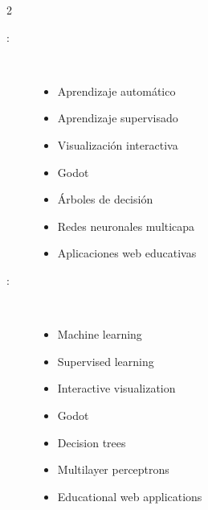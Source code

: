 \begin{multicols}{2}
\begin{description}
\item [\palabraschaveprincipal:] \mbox{} \\[-20pt]
  \begin{itemize}
    \item Aprendizaje automático
    \item Aprendizaje supervisado
    \item Visualización interactiva
    \item Godot
    \item Árboles de decisión
    \item Redes neuronales multicapa
    \item Aplicaciones web educativas
  \end{itemize}
\end{description}
\begin{description}
\item [\palabraschavesecundaria:] \mbox{} \\[-20pt]
  \begin{itemize}
    \item Machine learning
    \item Supervised learning
    \item Interactive visualization
    \item Godot
    \item Decision trees
    \item Multilayer perceptrons
    \item Educational web applications
  \end{itemize}
\end{description}
\end{multicols}
